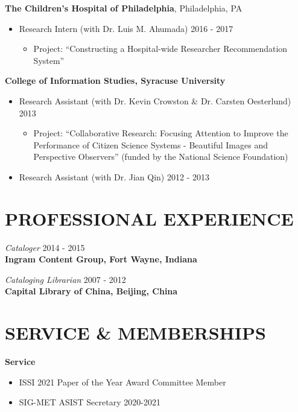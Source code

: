 \documentclass[margin, 10pt]{res} %
\begin{document}
\begin{resume}
\textbf{The Children's Hospital of Philadelphia}, Philadelphia, PA\\
\begin{itemize}
     \item Research Intern (with Dr. Luis M. Ahumada) \hfill 2016 - 2017
     \begin{itemize}
     	\item  Project: “Constructing a Hospital-wide Researcher Recommendation System”
   	\end{itemize}
\end{itemize}

\textbf{College of Information Studies, Syracuse University}\\
\begin{itemize}
	\item Research Assistant (with Dr. Kevin Crowston \& Dr. Carsten Oesterlund) \hfill 2013
    \begin{itemize}
     	\item Project: “Collaborative Research: Focusing Attention to Improve the Performance of Citizen Science Systems - Beautiful Images and Perspective Observers” (funded by the National Science Foundation)
    \end{itemize}
    \item Research Assistant (with Dr. Jian Qin) \hfill 2012 - 2013
\end{itemize}

\section{PROFESSIONAL EXPERIENCE}

\textit{Cataloger} \hfill 2014 - 2015\\
\textbf{Ingram Content Group, Fort Wayne, Indiana}

\textit{Cataloging Librarian} \hfill 2007 - 2012\\
\textbf{Capital Library of China, Beijing, China}

\section{SERVICE \& MEMBERSHIPS}

\textbf{Service}
\begin{itemize}
\item ISSI 2021 Paper of the Year Award Committee Member
\item SIG-MET ASIST Secretary 2020-2021
\end{itemize}



\end{resume}
\end{document}
